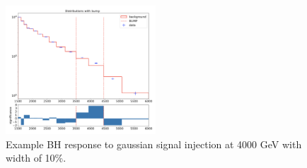 \begin{figure}[!htbp]
\centering
   \includegraphics[width=0.5\textwidth]{figures/stats/bh_bump_example}
    \caption{Example BH response to gaussian signal injection at 4000 GeV with width of 10\%. 
    \label{fig:bh_bump_example}}
\end{figure}


